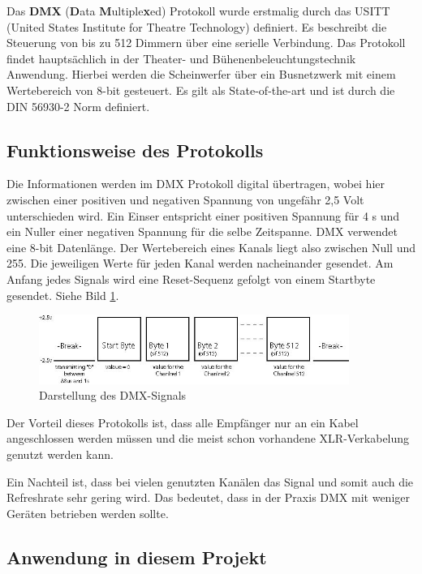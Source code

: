 Das \textbf{DMX} (\textbf{D}ata \textbf{M}ultiple\textbf{x}ed) Protokoll
wurde erstmalig durch das USITT (United States Institute for Theatre
Technology) definiert. Es beschreibt die Steuerung von bis zu 512
Dimmern über eine serielle Verbindung. Das Protokoll findet
hauptsächlich in der Theater- und Bühenenbeleuchtungstechnik Anwendung.
Hierbei werden die Scheinwerfer über ein Busnetzwerk mit einem
Wertebereich von 8-bit gesteuert. Es gilt als State-of-the-art und ist
durch die DIN 56930-2 Norm definiert.\cite{dmx512/1990}

\hypertarget{funktionsweise-des-protokolls}{%
\subsection{Funktionsweise des
Protokolls}\label{funktionsweise-des-protokolls}}

Die Informationen werden im DMX Protokoll digital übertragen, wobei hier
zwischen einer positiven und negativen Spannung von ungefähr 2,5 Volt
unterschieden wird. Ein Einser entspricht einer positiven Spannung für 4
\textmu s und ein Nuller einer negativen Spannung für die selbe
Zeitspanne. DMX verwendet eine 8-bit Datenlänge. Der Wertebereich eines
Kanals liegt also zwischen Null und 255. Die jeweiligen Werte für jeden
Kanal werden nacheinander gesendet. Am Anfang jedes Signals wird eine
Reset-Sequenz gefolgt von einem Startbyte gesendet.\cite{dmx-1} Siehe
Bild \ref{dmx-signal}.

\begin{figure}
\centering
\includegraphics[width=0.9\textwidth]{bilder/Clemens/dmx.jpg}
\caption{Darstellung des DMX-Signals\label{dmx-signal}}
\end{figure}

Der Vorteil dieses Protokolls ist, dass alle Empfänger nur an ein Kabel
angeschlossen werden müssen und die meist schon vorhandene
XLR-Verkabelung genutzt werden kann.\cite{dmx512/1990}

Ein Nachteil ist, dass bei vielen genutzten Kanälen das Signal und somit
auch die Refreshrate sehr gering wird. Das bedeutet, dass in der Praxis
DMX mit weniger Geräten betrieben werden sollte.\cite{dmx512/1990}

\hypertarget{anwendung-in-diesem-projekt}{%
\subsection{Anwendung in diesem
Projekt}\label{anwendung-in-diesem-projekt}}

